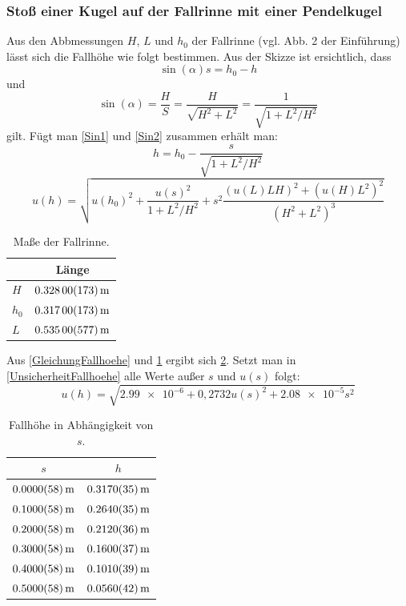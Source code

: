 \documentclass[
	a4paper,
	12pt,
	pagesize,
	ngerman
]{scrartcl}
\begin{document}
	\subsubsection{Stoß einer Kugel auf der Fallrinne mit einer Pendelkugel} %
	Aus den Abbmessungen $H$, $L$ und $h_0$ der Fallrinne (vgl. Abb. 2 der Einführung) lässt sich die Fallhöhe wie folgt bestimmen. Aus der Skizze ist ersichtlich, dass 
	\begin{equation}
		\sin(\alpha) s = h_0-h 
		\label{Sin1}
	\end{equation}
	und
	\begin{equation}
		\sin(\alpha) = \frac{H}{S} = \frac{H}{\sqrt{H^2+L^2}} = \frac{1}{\sqrt{1+L^2/H^2}}
		\label{Sin2}
	\end{equation}
	gilt. Fügt man \cref{Sin1} und \cref{Sin2} zusammen erhält man:
	\begin{equation}
		h = h_0 - \frac{s}{\sqrt{1+ L^2/H^2}}
		\label{GleichungFallhoehe}
	\end{equation}
	\begin{equation}
		u(h) = \sqrt{u(h_0)^2 + \frac{u(s)^2}{1+L^2/H^2} + s^2\frac{(u(L)LH)^2 + (u(H)L^2)^2}{(H^2 + L^2)^3} }
		\label{UnsicherheitFallhoehe}
	\end{equation}
	\begin{table}[tb]
	\centering
	\begin{tabular}{  l | c  }
		& Länge  \\ \hline 
		$H$ &  $\SI{0,328 \pm 0,00173}{m}$ \\ \hline 
		$h_0$ &  $\SI{0,317 \pm 0,00173}{m}$ \\ \hline 
		$L$ &  $\SI{0,535 \pm 0,00577}{m}$ 
	\end{tabular}
	\caption{Maße der Fallrinne.}
	\label{MessungFallrinne}
	\end{table}
	Aus \cref{GleichungFallhoehe} und \cref{MessungFallrinne} ergibt sich \cref{TabelleFallhoehe}. Setzt man in \cref{UnsicherheitFallhoehe} alle Werte außer $s$ und $u(s)$ folgt:
	\begin{equation}
		u(h) = \sqrt{ \SI{2,99e-6}+ 0,2732u(s)^2 + \SI{2,08e-5}s^2 }
	\end{equation}
	\begin{table}[tb]
	\centering
	\begin{tabular}{  c | c  }
		$s$  & $h$ \\ \hline 
		$\SI{0,00 \pm 0,0058}{m}$ &  $\SI{0,317 \pm 0,0035}{m}$ \\ \hline
		$\SI{0,10 \pm 0,0058}{m}$ &  $\SI{0,264 \pm 0,0035}{m}$ \\ \hline 
		$\SI{0,20 \pm 0,0058}{m}$ &  $\SI{0,212 \pm 0,0036}{m}$ \\ \hline
		$\SI{0,30 \pm 0,0058}{m}$ &  $\SI{0,160 \pm 0,0037}{m}$ \\ \hline
		$\SI{0,40 \pm 0,0058}{m}$ &  $\SI{0,101 \pm 0,0039}{m}$ \\ \hline 
		$\SI{0,50 \pm 0,0058}{m}$ &  $\SI{0,056 \pm 0,0042}{m}$  
	\end{tabular}
	\caption{Fallhöhe in Abhängigkeit von $s$.}
		\label{TabelleFallhoehe}
	\end{table}
\end{document}
